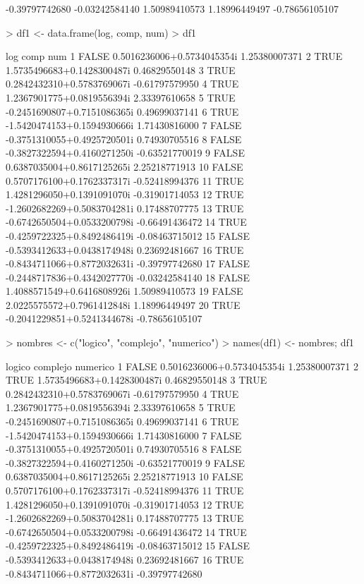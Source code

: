 \documentclass{article}
\begin{document}
\begin{Schunk}
\begin{Soutput}
[16] -0.39797742680 -0.03242584140  1.50989410573  1.18996449497 -0.78656105107
\end{Soutput}
\begin{Sinput}
> df1 <- data.frame(log, comp, num)
> df1
\end{Sinput}
\begin{Soutput}
     log                        comp            num
1  FALSE  0.5016236006+0.5734045354i  1.25380007371
2   TRUE  1.5735496683+0.1428300487i  0.46829550148
3   TRUE  0.2842432310+0.5783769067i -0.61797579950
4   TRUE  1.2367901775+0.0819556394i  2.33397610658
5   TRUE -0.2451690807+0.7151086365i  0.49699037141
6   TRUE -1.5420474153+0.1594930666i  1.71430816000
7  FALSE -0.3751310055+0.4925720501i  0.74930705516
8  FALSE -0.3827322594+0.4160271250i -0.63521770019
9  FALSE  0.6387035004+0.8617125265i  2.25218771913
10 FALSE  0.5707176100+0.1762337317i -0.52418994376
11  TRUE  1.4281296050+0.1391091070i -0.31901714053
12  TRUE -1.2602682269+0.5083704281i  0.17488707775
13  TRUE -0.6742650504+0.0533200798i -0.66491436472
14  TRUE -0.4259722325+0.8492486419i -0.08463715012
15 FALSE -0.5393412633+0.0438174948i  0.23692481667
16  TRUE -0.8434711066+0.8772032631i -0.39797742680
17 FALSE -0.2448717836+0.4342027770i -0.03242584140
18 FALSE  1.4088571549+0.6416808926i  1.50989410573
19 FALSE  2.0225575572+0.7961412848i  1.18996449497
20  TRUE -0.2041229851+0.5241344678i -0.78656105107
\end{Soutput}
\begin{Sinput}
> nombres <- c("logico", "complejo", "numerico")
> names(df1) <- nombres; df1
\end{Sinput}
\begin{Soutput}
   logico                    complejo       numerico
1   FALSE  0.5016236006+0.5734045354i  1.25380007371
2    TRUE  1.5735496683+0.1428300487i  0.46829550148
3    TRUE  0.2842432310+0.5783769067i -0.61797579950
4    TRUE  1.2367901775+0.0819556394i  2.33397610658
5    TRUE -0.2451690807+0.7151086365i  0.49699037141
6    TRUE -1.5420474153+0.1594930666i  1.71430816000
7   FALSE -0.3751310055+0.4925720501i  0.74930705516
8   FALSE -0.3827322594+0.4160271250i -0.63521770019
9   FALSE  0.6387035004+0.8617125265i  2.25218771913
10  FALSE  0.5707176100+0.1762337317i -0.52418994376
11   TRUE  1.4281296050+0.1391091070i -0.31901714053
12   TRUE -1.2602682269+0.5083704281i  0.17488707775
13   TRUE -0.6742650504+0.0533200798i -0.66491436472
14   TRUE -0.4259722325+0.8492486419i -0.08463715012
15  FALSE -0.5393412633+0.0438174948i  0.23692481667
16   TRUE -0.8434711066+0.8772032631i -0.39797742680

\end{Soutput}
\end{Schunk}
\end{document}
